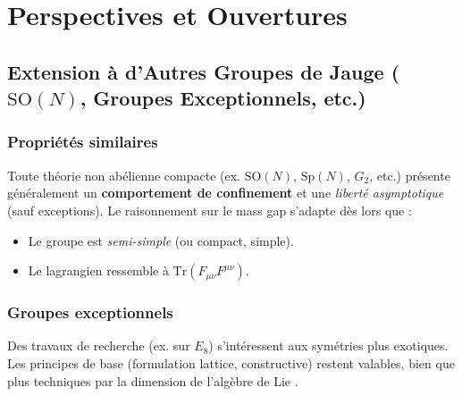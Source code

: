 \chapter{Perspectives et Ouvertures}
\label{chap:11}

\section{Extension à d’Autres Groupes de Jauge (\texorpdfstring{\(\mathrm{SO}(N)\)}{SO(N)}, Groupes Exceptionnels, etc.)}
\label{sec:11.1}

\subsection*{Propriétés similaires}
Toute théorie non abélienne compacte (ex. \(\mathrm{SO}(N)\), \(\mathrm{Sp}(N)\), \(G_2\), etc.) présente généralement un \textbf{comportement de confinement} et une \emph{liberté asymptotique} (sauf exceptions). Le raisonnement sur le mass gap s’adapte dès lors que :
\begin{itemize}
	\item Le groupe est \emph{semi-simple} (ou compact, simple).  
	\item Le lagrangien ressemble à \(\mathrm{Tr}(F_{\mu\nu}F^{\mu\nu})\).  
\end{itemize}

\subsection*{Groupes exceptionnels}
Des travaux de recherche (ex. sur \(E_8\)) s’intéressent aux symétries plus exotiques. Les principes de base (formulation lattice, constructive) restent valables, bien que plus techniques par la dimension de l’algèbre de Lie \cite{Slansky1981}.

\vspace{1em}

